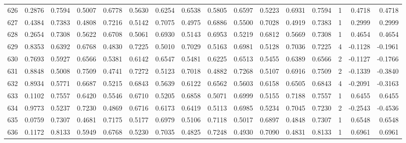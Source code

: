 \begin{tabular}{lrrrrrrrrrrrrrrr}
626 &      0.2876 &  0.7594 &  0.5007 &  0.6778 &  0.5630 &  0.6254 &  0.6538 &  0.5805 &  0.6597 &  0.5223 &   0.6931 &     0.7594 &      1 &                    0.4718 &                     0.4718 \\
627 &      0.4384 &  0.7383 &  0.4808 &  0.7216 &  0.5142 &  0.7075 &  0.4975 &  0.6886 &  0.5500 &  0.7028 &   0.4919 &     0.7383 &      1 &                    0.2999 &                     0.2999 \\
628 &      0.2654 &  0.7308 &  0.5622 &  0.6708 &  0.5061 &  0.6930 &  0.5143 &  0.6953 &  0.5219 &  0.6812 &   0.5669 &     0.7308 &      1 &                    0.4654 &                     0.4654 \\
629 &      0.8353 &  0.6392 &  0.6768 &  0.4830 &  0.7225 &  0.5010 &  0.7029 &  0.5163 &  0.6981 &  0.5128 &   0.7036 &     0.7225 &      4 &                   -0.1128 &                    -0.1961 \\
630 &      0.7693 &  0.5927 &  0.6566 &  0.5381 &  0.6142 &  0.6547 &  0.5481 &  0.6225 &  0.6513 &  0.5455 &   0.6389 &     0.6566 &      2 &                   -0.1127 &                    -0.1766 \\
631 &      0.8848 &  0.5008 &  0.7509 &  0.4741 &  0.7272 &  0.5123 &  0.7018 &  0.4882 &  0.7268 &  0.5107 &   0.6916 &     0.7509 &      2 &                   -0.1339 &                    -0.3840 \\
632 &      0.8934 &  0.5771 &  0.6687 &  0.5215 &  0.6843 &  0.5639 &  0.6122 &  0.6562 &  0.5603 &  0.6158 &   0.6505 &     0.6843 &      4 &                   -0.2091 &                    -0.3163 \\
633 &      0.1102 &  0.7557 &  0.6420 &  0.5546 &  0.6710 &  0.5205 &  0.6858 &  0.5071 &  0.6999 &  0.5155 &   0.7188 &     0.7557 &      1 &                    0.6455 &                     0.6455 \\
634 &      0.9773 &  0.5237 &  0.7230 &  0.4869 &  0.6716 &  0.6173 &  0.6419 &  0.5113 &  0.6985 &  0.5234 &   0.7045 &     0.7230 &      2 &                   -0.2543 &                    -0.4536 \\
635 &      0.0759 &  0.7307 &  0.4681 &  0.7175 &  0.5177 &  0.6979 &  0.5106 &  0.7118 &  0.5017 &  0.6897 &   0.4848 &     0.7307 &      1 &                    0.6548 &                     0.6548 \\
636 &      0.1172 &  0.8133 &  0.5949 &  0.6768 &  0.5230 &  0.7035 &  0.4825 &  0.7248 &  0.4930 &  0.7090 &   0.4831 &     0.8133 &      1 &                    0.6961 &                     0.6961 \\

\end{tabular}
